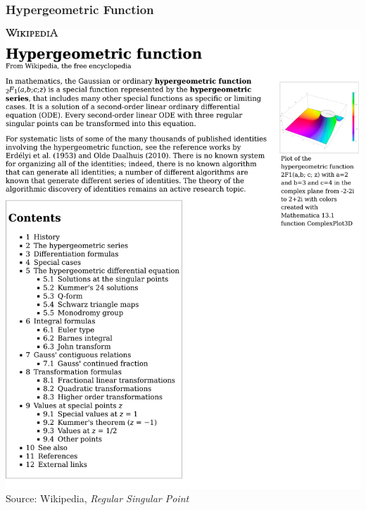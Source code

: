 \documentclass{beamer}
\begin{document}
\begin{frame}
\frametitle{Hypergeometric Function}
\includegraphics[page=1, clip, trim=0in 0in 0in 0in, width=\textwidth]{Hypergeometric Function - Wikipedia.pdf}
Source: Wikipedia, {\it Regular Singular Point}
\end{frame}
\end{document}
